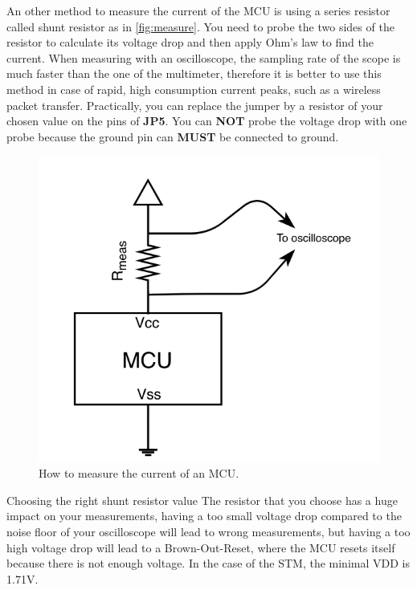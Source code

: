 An other method to measure the current of the MCU is using a series resistor called shunt resistor as in \autoref{fig:measure}. You need to probe the two sides of the resistor to calculate its voltage drop and then apply Ohm's law to find the current. When measuring with an oscilloscope, the sampling rate of the scope is much faster than the one of the multimeter, therefore it is better to use this method in case of rapid, high consumption current peaks, such as a wireless packet transfer. Practically, you can replace the jumper by a resistor of your chosen value on the pins of \textbf{JP5}. You can \textbf{NOT} probe the voltage drop with one probe because the ground pin can \textbf{MUST} be connected to ground.
\begin{figure}[h]
    \centering
    \includegraphics[scale=0.3]{figures/measuring.png}
    \caption{How to measure the current of an MCU.}
    \label{fig:measure}
\end{figure}

\begin{bclogo}[couleur = gray!20, arrondi = 0.2, logo=\bcattention]{Choosing the right shunt resistor value}
The resistor that you choose has a huge impact on your measurements, having a too small voltage drop compared to the noise floor of your oscilloscope will lead to wrong measurements, but having a too high voltage drop will lead to a Brown-Out-Reset, where the MCU resets itself because there is not enough voltage. In the case of the STM, the minimal VDD is 1.71V.\end{bclogo}

